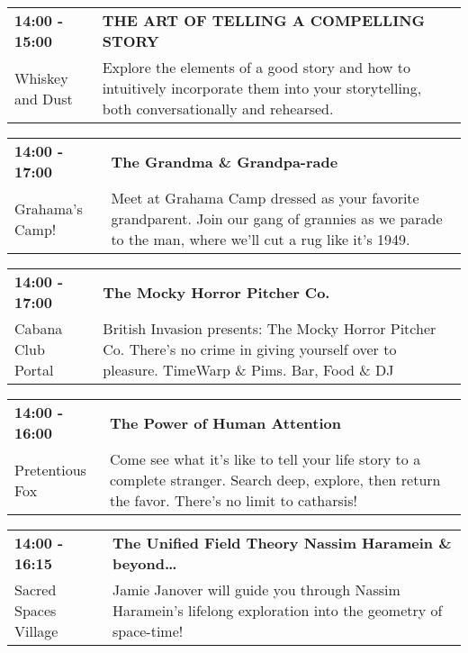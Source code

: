 \begin{tabular}{ p{1in} p{2.2in} }
    \textbf{14:00 - 15:00} & \textbf{THE ART OF TELLING A COMPELLING STORY} \\
    Whiskey and Dust \newline  & Explore the elements of a good story and how to intuitively incorporate them into your storytelling, both conversationally and rehearsed. \\
    \hline 
\end{tabular}
    
\begin{tabular}{ p{1in} p{2.2in} }
    \textbf{14:00 - 17:00} & \textbf{The Grandma \& Grandpa-rade} \\
    Grahama's Camp! \newline  & Meet at Grahama Camp dressed as your favorite grandparent. Join our gang of grannies as we parade to the man, where we'll cut a rug like it's 1949. \\
    \hline 
\end{tabular}
    
\begin{tabular}{ p{1in} p{2.2in} }
    \textbf{14:00 - 17:00} & \textbf{The Mocky Horror Pitcher Co.} \\
    Cabana Club \newline 430 Portal & British Invasion presents: The Mocky Horror Pitcher Co. There's no crime in giving yourself over to pleasure. TimeWarp \& Pims. Bar, Food \& DJ \\
    \hline 
\end{tabular}
    
\begin{tabular}{ p{1in} p{2.2in} }
    \textbf{14:00 - 16:00} & \textbf{The Power of Human Attention} \\
    Pretentious Fox \newline  & Come see what it's like to tell your life story to a complete stranger.  Search deep, explore, then return the favor.  There's no limit to catharsis! \\
    \hline 
\end{tabular}
    
\begin{tabular}{ p{1in} p{2.2in} }
    \textbf{14:00 - 16:15} & \textbf{The Unified Field Theory Nassim Haramein \& beyond\ldots} \\
    Sacred Spaces Village \newline  & Jamie Janover will guide you through Nassim Haramein's lifelong exploration into the geometry of space-time! \\
    \hline 
\end{tabular}
    
